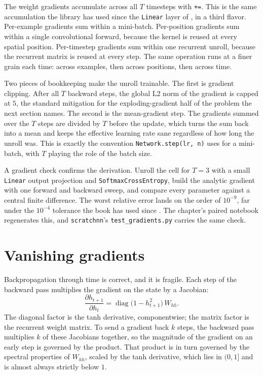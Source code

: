 The weight gradients accumulate across all $T$ timesteps with \texttt{+=}.
This is the same accumulation the library has used since the \texttt{Linear}
layer of , in a third flavor. Per-example gradients
sum within a mini-batch. Per-position gradients sum within a single
convolutional forward, because the kernel is reused at every spatial
position. Per-timestep gradients sum within one recurrent unroll, because
the recurrent matrix is reused at every step. The same operation runs at a
finer grain each time: across examples, then across positions, then across
time.

Two pieces of bookkeeping make the unroll trainable. The first is gradient
clipping. After all $T$ backward steps, the global L2 norm of the gradient
is capped at $5$, the standard mitigation for the exploding-gradient half of
the problem the next section names. The second is the mean-gradient step.
The gradients summed over the $T$ steps are divided by $T$ before the
update, which turns the sum back into a mean and keeps the effective
learning rate sane regardless of how long the unroll was. This is exactly
the convention \texttt{Network.step(lr, n)} uses for a mini-batch, with $T$
playing the role of the batch size.

A gradient check confirms the derivation. Unroll the cell for $T = 3$ with a
small \texttt{Linear} output projection and \texttt{SoftmaxCrossEntropy},
build the analytic gradient with one forward and backward sweep, and compare
every parameter against a central finite difference. The worst relative
error lands on the order of $10^{-9}$, far under the $10^{-4}$ tolerance the
book has used since . The chapter's paired notebook
regenerates this, and \texttt{scratchnn}'s
\texttt{test\_gradients.py} carries the same check.

\section{Vanishing gradients}\label{sec:vanishing-gradients}

Backpropagation through time is correct, and it is fragile. Each step of the
backward pass multiplies the gradient on the state by a Jacobian:
\begin{equation}\label{eq:rnn-jacobian}
  \frac{\partial h_{t+1}}{\partial h_t}
  = \operatorname{diag}\!\bigl(1 - h_{t+1}^2\bigr)\, W_{hh}.
\end{equation}
The diagonal factor is the tanh derivative, componentwise; the matrix factor
is the recurrent weight matrix. To send a gradient back $k$ steps, the
backward pass multiplies $k$ of these Jacobians together, so the magnitude
of the gradient on an early step is governed by the product. That product is
in turn governed by the spectral properties of $W_{hh}$, scaled by the tanh
derivative, which lies in $(0, 1]$ and is almost always strictly below $1$.

